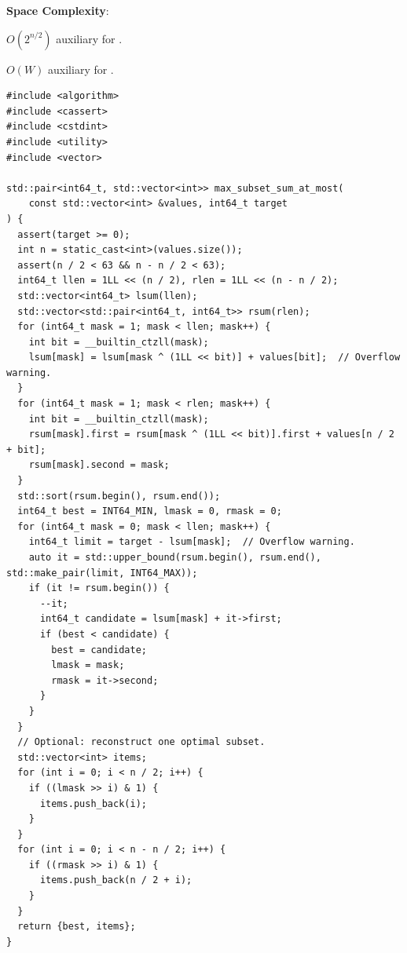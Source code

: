 \textbf{Space Complexity}:
\begin{compactitem}
  \item $O(2^{n/2})$ auxiliary for .
  \item $O(W)$ auxiliary for .
\end{compactitem}

\begin{lstlisting}[style=cpp]
#include <algorithm>
#include <cassert>
#include <cstdint>
#include <utility>
#include <vector>

std::pair<int64_t, std::vector<int>> max_subset_sum_at_most(
    const std::vector<int> &values, int64_t target
) {
  assert(target >= 0);
  int n = static_cast<int>(values.size());
  assert(n / 2 < 63 && n - n / 2 < 63);
  int64_t llen = 1LL << (n / 2), rlen = 1LL << (n - n / 2);
  std::vector<int64_t> lsum(llen);
  std::vector<std::pair<int64_t, int64_t>> rsum(rlen);
  for (int64_t mask = 1; mask < llen; mask++) {
    int bit = __builtin_ctzll(mask);
    lsum[mask] = lsum[mask ^ (1LL << bit)] + values[bit];  // Overflow warning.
  }
  for (int64_t mask = 1; mask < rlen; mask++) {
    int bit = __builtin_ctzll(mask);
    rsum[mask].first = rsum[mask ^ (1LL << bit)].first + values[n / 2 + bit];
    rsum[mask].second = mask;
  }
  std::sort(rsum.begin(), rsum.end());
  int64_t best = INT64_MIN, lmask = 0, rmask = 0;
  for (int64_t mask = 0; mask < llen; mask++) {
    int64_t limit = target - lsum[mask];  // Overflow warning.
    auto it = std::upper_bound(rsum.begin(), rsum.end(), std::make_pair(limit, INT64_MAX));
    if (it != rsum.begin()) {
      --it;
      int64_t candidate = lsum[mask] + it->first;
      if (best < candidate) {
        best = candidate;
        lmask = mask;
        rmask = it->second;
      }
    }
  }
  // Optional: reconstruct one optimal subset.
  std::vector<int> items;
  for (int i = 0; i < n / 2; i++) {
    if ((lmask >> i) & 1) {
      items.push_back(i);
    }
  }
  for (int i = 0; i < n - n / 2; i++) {
    if ((rmask >> i) & 1) {
      items.push_back(n / 2 + i);
    }
  }
  return {best, items};
}


\end{lstlisting}

